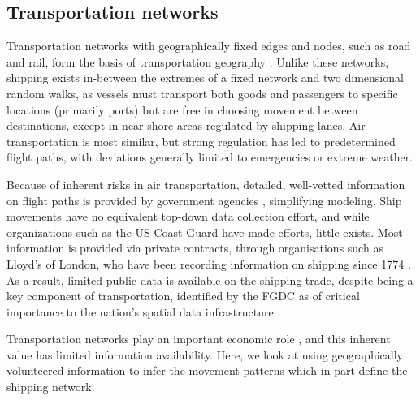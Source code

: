 
\subsection{Transportation networks}

Transportation networks with geographically fixed edges and nodes, such as road and rail, form the basis of transportation geography \cite{Rodrigue2009}. Unlike these networks, shipping exists in-between the extremes of a fixed network %
 and two dimensional random walks, %
  as vessels must transport both goods and passengers to specific locations (primarily ports) but are free in choosing movement between destinations, except in near shore areas regulated by shipping lanes. Air transportation is most similar, but strong regulation has led to predetermined flight paths, with deviations generally limited to emergencies or extreme weather. %

Because of inherent risks in air transportation, detailed, well-vetted information on flight paths is provided by government agencies \cite{guimera2005worldwide}, simplifying modeling. Ship movements have no equivalent top-down data collection effort, and while organizations such as the US Coast Guard have made efforts, little exists. Most information is provided via private contracts, through organisations such as Lloyd's of London, who have been recording information on shipping since 1774 \citep{Lloyd'sRegister-FairplayLtd.2010}. As a result, limited public data is available on the shipping trade, despite being a key component of transportation, identified by the FGDC \citep{FGDC} as of critical importance to the nation's spatial data infrastructure \citep{CurrierInPress}.

Transportation networks play an important economic role \cite{canning1993effects}, and this inherent value has limited information availability. Here, we look at using geographically volunteered information to infer the movement patterns which in part define the shipping network.



